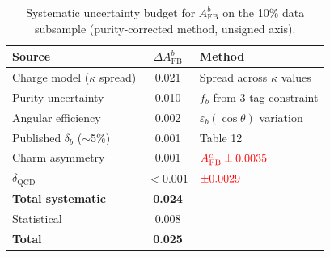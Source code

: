 \documentclass[11pt,a4paper]{article}
\newcommand{\external}[1]{\textcolor{red}{#1}}
\begin{document}
\begin{table}[htbp]
\centering
\caption{Systematic uncertainty budget for $A_\text{FB}^b$ on
the 10\% data subsample (purity-corrected method, unsigned axis).}
\label{tbl:syst_afb}
\begin{tabular}{lcl}
\toprule
Source & $\Delta A_\text{FB}^b$ & Method \\
\midrule
Charge model ($\kappa$ spread) & 0.021 & Spread across $\kappa$ values \\
Purity uncertainty & 0.010 & $f_b$ from 3-tag constraint \\
Angular efficiency & 0.002 & $\varepsilon_b(\cos\theta)$ variation \\
Published $\delta_b$ ($\sim$5\%) & 0.001 & \cite{LEP:EWWG:2005} Table 12 \\
Charm asymmetry & 0.001 & $\external{A_\text{FB}^c \pm 0.0035}$ \\
$\delta_\text{QCD}$ & $< 0.001$ & $\external{\pm 0.0029}$~\cite{LEP:EWWG:2005} \\
\midrule
\textbf{Total systematic} & \textbf{0.024} & \\
Statistical & 0.008 & \\
\textbf{Total} & \textbf{0.025} & \\
\bottomrule
\end{tabular}
\end{table}
\end{document}
